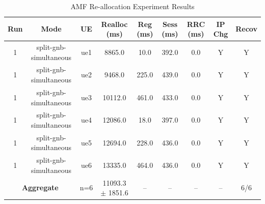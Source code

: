 \begin{table}[ht]
\centering
\begin{tabular}{|c|c|c|c|c|c|c|c|c|}
\hline
Run & Mode & UE & Realloc (ms) & Reg (ms) & Sess (ms) & RRC (ms) & IP Chg & Recov \\
\hline
1 & split-gnb-simultaneous & ue1 & 8865.0 & 10.0 & 392.0 & 0.0 & Y & Y \\
1 & split-gnb-simultaneous & ue2 & 9468.0 & 225.0 & 439.0 & 0.0 & Y & Y \\
1 & split-gnb-simultaneous & ue3 & 10112.0 & 461.0 & 433.0 & 0.0 & Y & Y \\
1 & split-gnb-simultaneous & ue4 & 12086.0 & 18.0 & 397.0 & 0.0 & Y & Y \\
1 & split-gnb-simultaneous & ue5 & 12694.0 & 228.0 & 436.0 & 0.0 & Y & Y \\
1 & split-gnb-simultaneous & ue6 & 13335.0 & 464.0 & 436.0 & 0.0 & Y & Y \\
\multicolumn{2}{|c|}{\textbf{Aggregate}} & n=6 & 11093.3 $\pm$ 1851.6 & -- & -- & -- & -- & 6/6 \\
\hline
\end{tabular}
\caption{AMF Re-allocation Experiment Results}
\label{tab:amf_realloc}
\end{table}
